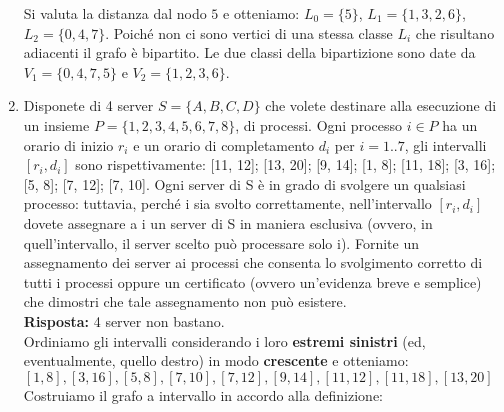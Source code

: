 \documentclass[10pt,a4paper,titlepage]{article}
\theoremstyle{break}
\theoremstyle{break}
\theoremstyle{break}
\begin{document}
\begin{enumerate}
Si valuta la distanza dal nodo $5$ e otteniamo: $L_0 = \lbrace 5 \rbrace$, $L_1 = \lbrace 1,3,2,6 \rbrace$, $L_2 = \lbrace 0,4,7 \rbrace$. Poiché non ci sono vertici di una stessa classe $L_i$ che risultano adiacenti il grafo è bipartito. Le due classi della bipartizione sono date da $V_1 = \lbrace 0, 4, 7, 5\rbrace$ e $V_2 = \lbrace 1, 2, 3, 6 \rbrace$.


\item Disponete di 4 server $S = \lbrace A, B,C, D \rbrace$ che volete destinare alla esecuzione di un insieme $P = \lbrace 1, 2, 3, 4, 5, 6, 7, 8 \rbrace$, di processi. Ogni processo $i \in P$ ha un orario di inizio $r_i$ e un orario di completamento $d_i$ per $i = 1..7$, gli intervalli $[r_i, d_i ]$ sono rispettivamente: [11, 12]; [13, 20]; [9, 14]; [1, 8]; [11, 18]; [3, 16]; [5, 8]; [7, 12]; [7, 10].
Ogni server di S è in grado di svolgere un qualsiasi processo: tuttavia, perché i sia svolto correttamente,
nell'intervallo  $[r_i, d_i ]$ dovete assegnare a i un server di S in maniera esclusiva (ovvero, in quell'intervallo, il
server scelto può processare solo i). Fornite un assegnamento dei server ai processi che consenta lo svolgimento corretto di tutti i processi oppure un certificato (ovvero un'evidenza breve e semplice) che dimostri che tale assegnamento non può esistere. \\
\textbf{Risposta:} 4 server non bastano. \\
Ordiniamo gli intervalli considerando i loro \textbf{estremi sinistri} (ed, eventualmente, quello destro) in modo \textbf{crescente} e otteniamo: \\
$[1, 8], [3, 16], [5, 8], [7, 10], [7, 12], [9, 14], [11, 12], [11, 18], [13, 20]$ \\
Costruiamo il grafo a intervallo in accordo alla definizione: \\

\end{enumerate}
\end{document}
